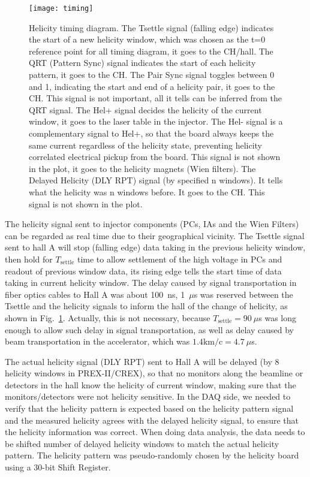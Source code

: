 \begin{figure}
    \centering
    \texttt{[image: timing]}
    \caption{Helicity timing diagram. The Tsettle signal (falling edge) indicates 
    the start of a new helicity window, which was chosen as the t=0 reference
    point for all timing diagram, it goes to the CH/hall.
    The QRT (Pattern Sync) signal indicates the start of each helicity pattern,
    it goes to the CH. 
    The Pair Sync signal toggles between 0 and 1, indicating the start and end
    of a helicity pair, it goes to the CH. This signal is not important, all it
    tells can be inferred from the QRT signal.
    The Hel+ signal decides the helicity of the current window, it goes to the 
    laser table in the injector.
    The Hel- signal is a complementary signal to Hel+, so that the board always 
    keeps the same current regardless of the helicity state, preventing helicity 
    correlated electrical pickup from the board. This signal is not shown in the
    plot, it goes to the helicity magnets (Wien filters).
    The Delayed Helicity (DLY RPT) signal (by specified n windows).
    It tells what the helicity was n windows before. It goes to the CH. This
    signal is not shown in the plot.}
    \label{fig:timing}
\end{figure}

The helicity signal sent to injector components (PCs, IAs and the Wien Filters) 
can be regarded as real time due to their geographical vicinity. The Tsettle 
signal sent to hall A 
will stop (falling edge) data taking in the previous helicity window, then hold for
$T_{\text{settle}}$ time to allow settlement of the high voltage in PCs %
and readout of previous window data, its rising edge tells the start time of data taking in current 
helicity window. The delay caused by signal transportation in fiber optics cables to Hall A 
was about 100~ns, 1~$\mu$s was reserved between the Tsettle and the helicity
signals to inform the hall of the change of helicity, as shown in Fig.~\ref{fig:timing}.
Actually, this is not necessary, because $T_{\text{settle}} = 90\ \mu$s was long enough to
allow such delay in signal transportation, as well as delay caused by beam 
transportation in the accelerator, which was $1.4 \text{km/c} = 4.7\ \mu$s.

The actual helicity signal (DLY RPT) sent to Hall A will be delayed (by 8 helicity windows
in PREX-II/CREX), so that no monitors along the beamline or detectors in the 
hall know the helicity of current window, making sure that the monitors/detectors
were not helicity sensitive. In the DAQ side, we needed to verify that
the helicity pattern is expected based on the helicity pattern signal and the 
measured helicity agrees with the delayed helicity signal, to ensure that the
helicity information was correct. When doing data analysis, the data needs 
to be shifted number of delayed helicity windows to match the actual helicity 
pattern. The helicity pattern was pseudo-randomly chosen by the helicity board 
using a 30-bit Shift Register.

